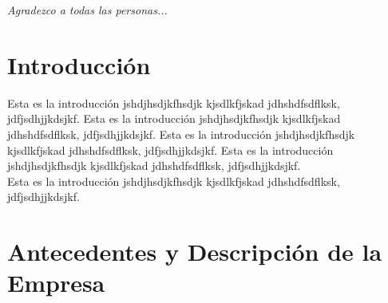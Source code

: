\documentclass[12pt,letterpaper,spanish]{report}
\newenvironment{dedication}{\newpage\large\null\em\vskip1in}%
{\vfill}
\begin{document}
        \thispagestyle{empty}

        \begin{dedication}
           Agradezco a todas las personas...
        \end{dedication}




\tableofcontents



\oddsidemargin 0.2in \textwidth 6.5in \topmargin -0.25in
\textheight 9in \pagestyle{myheadings}

\newpage



\chapter{Introducción}
\newpage


Esta es la introducción jshdjhsdjkfhsdjk kjsdlkfjskad jdhshdfsdflksk, jdfjsdhjjkdsjkf.
Esta es la introducción jshdjhsdjkfhsdjk kjsdlkfjskad jdhshdfsdflksk, jdfjsdhjjkdsjkf.
Esta es la introducción jshdjhsdjkfhsdjk kjsdlkfjskad jdhshdfsdflksk, jdfjsdhjjkdsjkf.
Esta es la introducción jshdjhsdjkfhsdjk kjsdlkfjskad jdhshdfsdflksk, jdfjsdhjjkdsjkf.
\\




Esta es la introducción jshdjhsdjkfhsdjk kjsdlkfjskad jdhshdfsdflksk, jdfjsdhjjkdsjkf.



\chapter{Antecedentes y Descripción de la Empresa}
\newpage
\end{document}
